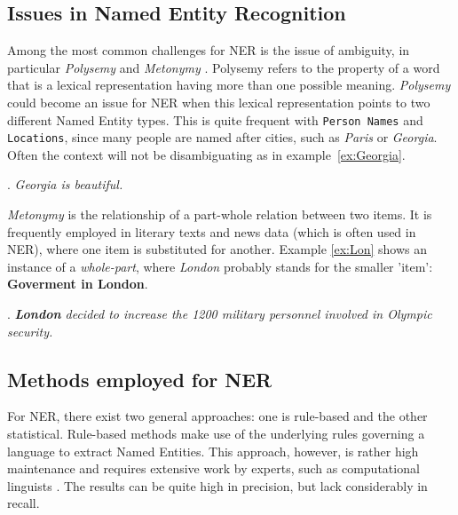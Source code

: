 \documentclass[11pt]{article}
\begin{document}
\subsection{Issues in Named Entity Recognition}
Among the most common challenges for NER is the issue of ambiguity, in particular \emph{Polysemy} and \emph{Metonymy} \cite{nadeau2007survey}.
Polysemy refers to the property of a word that is a lexical representation having more than one possible meaning.
\emph{Polysemy} could become an issue for NER when this lexical representation points to two different Named Entity types.
This is quite frequent with \texttt{Person Names} and \texttt{Locations}, since many people are named after cities, such as \emph{Paris} or \emph{Georgia}. 
Often the context will not be disambiguating as in example~\ref{ex:Georgia}.

\ex. \emph{Georgia is beautiful.} \label{ex:Georgia}

\emph{Metonymy} is the relationship of a part-whole relation between two items.
It is frequently employed in literary texts and news data (which is often used in NER), where one item is substituted for another. 
Example \ref{ex:Lon} shows an instance of a \emph{whole-part}, where \emph{London} probably stands for the smaller 'item': \textbf{Goverment in London}. 

\ex. \emph{\textbf{London} decided to increase the 1200 military personnel involved in Olympic security.} \label{ex:Lon}

\subsection{Methods employed for NER}
For NER, there exist two general approaches: one is rule-based and the other statistical. 
Rule-based methods make use of the underlying rules governing a language to extract Named Entities. 
This approach, however, is rather high maintenance and requires extensive work by experts, such as computational linguists \cite{nadeau2007survey}.
The results can be quite high in precision, but lack considerably in recall. %
\end{document}
